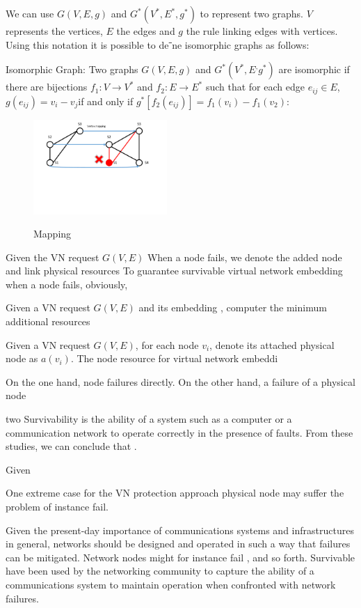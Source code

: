 We can use $G(V, E, g)$ and $G^*(V^*, E^*, g^*)$ to represent two graphs. $V$ represents the vertices, $E$ the edges and $g$ the rule linking edges with vertices. Using this notation it is possible to deˉne isomorphic graphs as follows:

Isomorphic Graph: Two graphs $G(V, E, g)$ and $G^*(V^*, E^, g^*)$ are isomorphic if there are bijections $f_1:V\rightarrow V^*$ and $f_2 :E\rightarrow E^*$ such that for each edge $e_{ij}\in E$, $g(e_{ij})=v_i-v_j$if and only if $g^*[f_2(e_{ij})]=f_1(v_i)-f_1(v_2)$:




\begin{figure}
\centering
\includegraphics[width=2in]{Fig/Mapping}\\
\caption{Mapping}\label{fig:Mapping}
\end{figure}

Given the VN request $G (V,E)$
When a node fails, we denote the added node and link physical resources
To guarantee survivable virtual network embedding when a node fails, obviously,




Given a VN request $G(V,E)$ and its embedding , computer the  minimum additional resources

Given a VN request $G(V,E)$, for each node $v_i$, denote its attached physical node as $a(v_i)$. The node resource for virtual network embeddi



On the one hand, node failures  directly. On the other hand, a failure of a physical node

 two
 Survivability is the ability of a system such as a computer or a communication network to operate correctly in the presence of faults. From these studies, we can conclude that .




Given

 One extreme case for the VN protection approach
physical node may suffer the problem of instance fail.


Given the present-day importance of communications systems and infrastructures in general, networks should be designed and operated in such a way that failures can be mitigated. Network nodes  might for instance fail , and so forth. Survivable have been used by the networking community to capture the ability of a communications system to maintain operation when confronted
with network failures.

